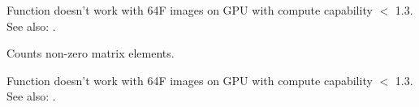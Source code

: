 Function doesn't work with 64F images on GPU with compute capability $<$ 1.3.\newline
See also: .


Counts non-zero matrix elements.

\begin{description}
\end{description}

Function doesn't work with 64F images on GPU with compute capability $<$ 1.3.\newline
See also: .